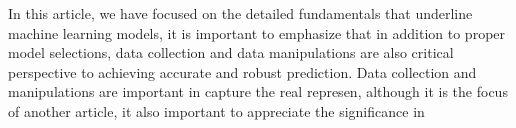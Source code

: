 
\par
In this article, we have focused on the detailed fundamentals that underline machine learning models, it is important to emphasize that in addition to proper model selections, data collection and data manipulations are also critical perspective to achieving accurate and robust prediction. Data collection and manipulations are important in capture the real represen, although it is the focus of another article, it also important to appreciate the significance in 
\par 
